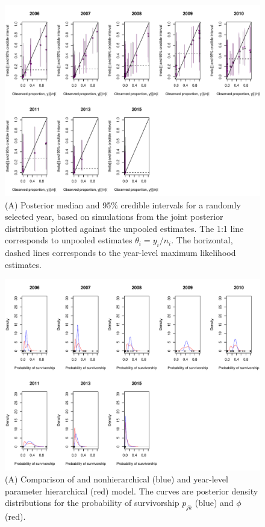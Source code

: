 \documentclass[12pt, oneside, titlepage]{article}   	%
\begin{document}
\begin{figure}[h]
   \centering
       \includegraphics[page=1,width=.9\textwidth]{../figures/appendix-x-figure54}  
    \caption{ (A) Posterior median and 95\% credible intervals for a randomly selected year, based on simulations from the joint posterior distribution plotted against the unpooled estimates. The 1:1 line corresponds to unpooled estimates $\theta_i = y_i/n_i$. The horizontal, dashed lines corresponds to the year-level maximum likelihood estimates. } 
 \label{fig:hierarchical_shrinking2}
\end{figure}


 \begin{figure}[h]
   \centering
       \includegraphics[page=1,width=.9\textwidth]{../figures/appendix-x-hierarchyPosteriors_nh_hyear}  
    \caption{ (A) Comparison of and nonhierarchical (blue) and year-level parameter hierarchical (red) model. The curves are posterior density distributions for the probability of survivorship $p_{jk}$ (blue) and $\phi$ (red). } 
 \label{fig:hierarchyPosteriors_nh_hyear}
\end{figure}
\end{document}
